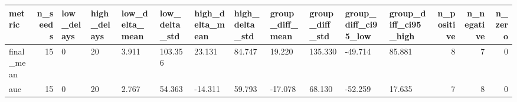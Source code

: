 \begin{tabular}{lrllllllllllrrr}
\toprule
metric & n_seeds & low_delays & high_delays & low_delta_mean & low_delta_std & high_delta_mean & high_delta_std & group_diff_mean & group_diff_std & group_diff_ci95_low & group_diff_ci95_high & n_positive & n_negative & n_zero \\
\midrule
final_mean & 15 & 0 & 20 & 3.911 & 103.356 & 23.131 & 84.747 & 19.220 & 135.330 & -49.714 & 85.881 & 8 & 7 & 0 \\
auc & 15 & 0 & 20 & 2.767 & 54.363 & -14.311 & 59.793 & -17.078 & 68.130 & -52.259 & 17.635 & 7 & 8 & 0 \\
\bottomrule
\end{tabular}
